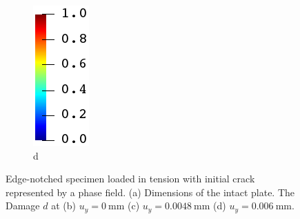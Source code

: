 \begin{figure}[htb!]
\begin{subfigure}[b]{0.21\textwidth}
    \caption{}
  \end{subfigure}
  \begin{subfigure}[b]{0.06\textwidth}
    \centering
    \caption*{d}
    \includegraphics[width=\textwidth]{Chapter4/figures/jet_vertical.png}
    \vspace{0.15in}
  \end{subfigure}
  \caption{ Edge-notched specimen loaded in tension  with initial crack represented by a phase field.  (a) Dimensions of the intact plate. The  Damage $d$ at (b) $u_y = \SI{0}{\milli\meter}$ (c) $u_y = \SI{0.0048}{\milli\meter}$ (d) $u_y = \SI{0.006}{\milli\meter}$. }
  \label{fig: Chapter4/mode1_intact_plate}
\end{figure}
